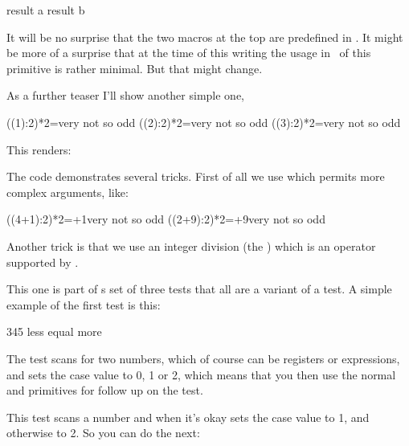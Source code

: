 \ifcondition\ifwhatever{10pt}
    result a
\else
    result b
\fi
\stoptyping

It will be no surprise that the two macros at the top are predefined in \CONTEXT.
It might be more of a surprise that at the time of this writing the usage in
\CONTEXT\ of this \type {\ifcondition} primitive is rather minimal. But that
might change.

As a further teaser I'll show another simple one,

\startbuffer
\def\HowOdd#1{\unless\ifnum\numexpr ((#1):2)*2\relax=\numexpr#1\relax}

\ifcondition\HowOdd{1}very \else not so \fi odd
\ifcondition\HowOdd{2}very \else not so \fi odd
\ifcondition\HowOdd{3}very \else not so \fi odd
\stopbuffer

\typebuffer[option=TEX]

This renders:

\startlines
\getbuffer
\stoplines

The code demonstrates several tricks. First of all we use \type {\numexpr} which
permits more complex arguments, like:

\starttyping[option=TEX]
\ifcondition\HowOdd{4+1}very \else not so \fi odd
\ifcondition\HowOdd{2\scratchcounter+9}very \else not so \fi odd
\stoptyping

Another trick is that we use an integer division (the \type {:}) which is an
operator supported by \LUAMETATEX .

\stopsubsection

\stopsection

\startsection[title={\LUAMETATEX\ primitives}]

\startsubsection[title={\tex{ifcmpnum}}]

This one is part of s set of three tests that all are a variant of a \type
{\ifcase} test. A simple example of the first test is this:

\starttyping[option=TEX]
 345 less \or equal \else more \fi
\stoptyping

The test scans for two numbers, which of course can be registers or expressions,
and sets the case value to 0, 1 or 2, which means that you then use the normal
\type {\or} and \type {\else} primitives for follow up on the test.

\stopsubsection

\startsubsection[title={\tex{ifchknum}}]

This test scans a number and when it's okay sets the case value to 1, and otherwise
to 2. So you can do the next:

